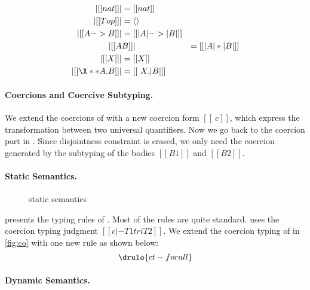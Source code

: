 \begin{definition} \label{def:type:translate:fi}
  \begin{align*}
    | [[nat]] | &= [[nat]] \\
    | [[Top]] | &= \langle \rangle \\
    | [[A -> B]]  | &= [[ | A | -> | B |  ]] \\
    | [[ A & B  ]] | &= [[ | A | * | B |  ]] \\
    | [[ X  ]] | &= [[ X ]] \\
    | [[ \X ** A . B ]] | &= [[ \ X . | B | ]]
  \end{align*}
\end{definition}


\paragraph{Coercions and Coercive Subtyping.}

We extend the coercions of \tname with a new coercion form $[[ \ c ]]$, which
express the transformation between two universal quantifiers. Now we go back to
the coercion part in . Since disjointness constraint is erased,
we only need the coercion generated by the subtyping of the bodies $[[B1]]$ and
$[[B2]]$.


\paragraph{\tnamee Static Semantics.}


\begin{figure}
  \centering
  \caption{\tnamee static semantics}
  \label{fig:typing:fco}
\end{figure}

 presents the typing rules of \tnamee. Most of the rules
are quite standard.  uses the coercion typing judgment $[[ c |- T1 tri T2 ]]$.
We extend the coercion typing of \tname in \cref{fig:co} with one new rule
 as shown below:
\[
  \drule{ct-forall}
\]


\paragraph{\tnamee Dynamic Semantics.}

